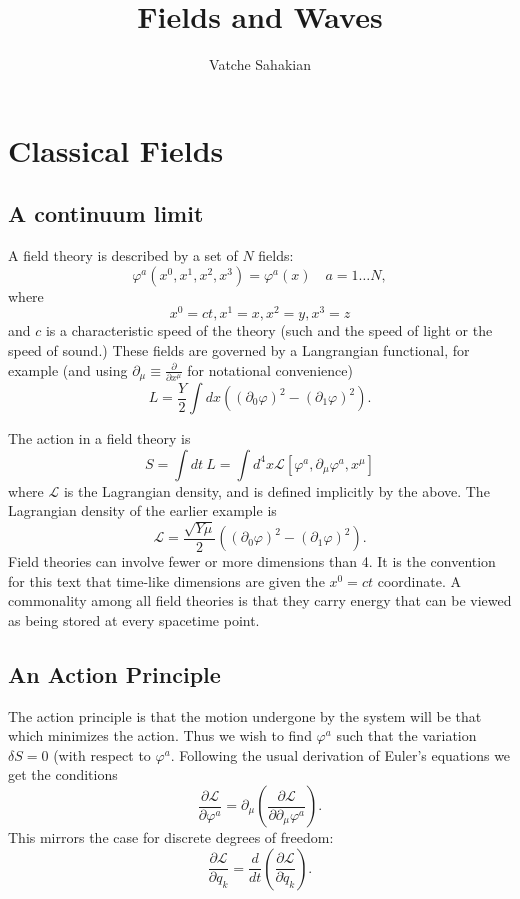 \documentclass[cm]{article}
\title{Fields and Waves}
\author{Vatche Sahakian}
\begin{document}
\maketitle

\section{Classical Fields}
\subsection{A continuum limit}

A field theory is described by a set of $N$ fields:
\[ \varphi^a(x^0, x^1, x^2, x^3) = \varphi^a(x) \quad a = 1 \ldots N,\]
where
\[x^0 = ct, x^1 = x, x^2 = y, x^3 = z \]
and $c$ is a characteristic speed of the theory (such and the speed of light or
the speed of sound.) These fields are governed by a Langrangian functional, for
example (and using $ \partial_{\mu} \equiv \frac{\partial}{\partial x^{\mu}} $
for notational convenience)
\[L=\frac{Y}2 \int dx \left( (\partial_0 \varphi)^2 -(\partial_1\varphi)^2\right).\]

The action in a field theory is
\[ S = \int dt \  L = \int d^4x \mathcal{L} [\varphi^a, \partial_{\mu} \varphi^a,
  x^{\mu}] \]
where $\mathcal{L}$ is the Lagrangian density, and is defined implicitly by the
above.
\xdefn
The Lagrangian density of the earlier example is
\[ \mathcal{L} = \frac{\sqrt{Y \mu}}{2} \left( (\partial_0 \varphi)^2 -
    (\partial_1 \varphi)^2 \right). \]
Field theories can involve fewer or more dimensions than 4. It is the convention
for this text that time-like dimensions are given the $x^0 = ct$ coordinate. A
commonality among all field theories is that they carry energy that can be
viewed as being stored at every spacetime point.
\subsection{An Action Principle}
The action principle is that the motion undergone by the system will be that
which minimizes the action. Thus we wish to find $\varphi^a$ such that the
variation $\delta S = 0$ (with respect to $\varphi^a$. Following the usual
derivation of Euler's equations we get the conditions
\[ \frac{\partial \mathcal{L}}{\partial \varphi^a} = \partial_{\mu} \left(
  \frac{ \partial \mathcal{L}}{ \partial \partial_{\mu} \varphi^a} \right). \]
This mirrors the case for discrete degrees of freedom:
\[ \frac{\partial \mathcal{L}}{\partial q_k} = \frac{d}{dt} \left( \frac{
  \partial \mathcal{L}}{\partial \dot{q}_k} \right).\]
\end{document}
